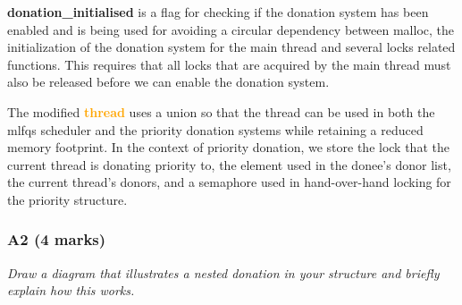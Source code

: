 \documentclass{report}
\newcommand{\question}[1]{\textit{#1} \\ }
\newcommand{\file}[1]{\textcolor{YellowGreen}{\textbf{#1}}}
\newcommand{\struct}[1]{\textcolor{orange}{\textbf{#1}}}
\newcommand{\var}[1]{\textcolor{RoyalPurple}{\textbf{#1}}}
\newcommand{\pintoscode}[4]{}
\begin{document}
                \pintoscode{43}{43}{donation.h}{donation.h}
                \var{donation\_initialised} is a flag for checking if the donation system has been enabled and is being used for 
                avoiding a circular dependency between malloc, the initialization of the donation system for the main thread 
                and several locks related functions. This requires that all locks that are acquired by the main thread must also
                be released before we can enable the donation system.
                \pintoscode{91}{123}{thread.h}{thread.h}
                The modified \struct{thread} uses a union so that the thread can be used in both the mlfqs scheduler 
                and the priority donation systems while retaining a reduced memory footprint. In the context of priority donation,
                we store the lock that the current thread is donating priority to, the element used in the donee's donor list,
                the current thread's donors, and a semaphore used in hand-over-hand locking for the priority structure.

            \subsubsection*{A2  (4 marks) }
                \question{Draw a diagram that illustrates a nested donation in your structure and briefly explain how this works.}
\end{document}
